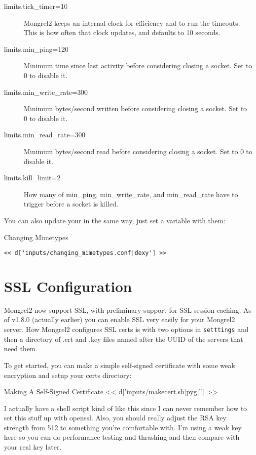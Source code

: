 \begin{description}
\item[limits.tick\_timer=10] Mongrel2 keeps an internal clock for efficiency and to run the
timeouts.  This is how often that clock updates, and defaults to 10 seconds.

\item[limits.min\_ping=120] Minimum time since last activity before considering closing a socket.  Set to 0 to disable it.
\item[limits.min\_write\_rate=300] Minimum bytes/second written before considering closing a socket. Set to 0 to disable it.
\item[limits.min\_read\_rate=300] Minimum bytes/second read before considering closing a socket. Set to 0 to disable it.
\item[limits.kill\_limit=2] How many of min\_ping, min\_write\_rate, and min\_read\_rate have to trigger before a socket is killed.
\end{description}


You can also update your  in the same way, just set a variable with them:

\begin{code}{Changing Mimetypes}
\begin{lstlisting}
<< d['inputs/changing_mimetypes.conf|dexy'] >>
\end{lstlisting}
\end{code}


\section{SSL Configuration}

Mongrel2 now support SSL, with preliminary support for SSL session caching.  As of 
v1.8.0 (actually earlier) you can enable SSL very easily for your Mongrel2 server.
How Mongrel2 configures SSL certs is with two options in \verb|setttings| and then
a directory of .crt and .key files named after the UUID of the servers that need them.

To get started, you can make a simple self-signed certificate with some weak encryption
and setup your certs directory:

\begin{code}{Making A Self-Signed Certificate}
<< d['inputs/makecert.sh|pyg|l'] >>
\end{code}

I actually have a shell script kind of like this since I can never remember how 
to set this stuff up with openssl.  Also, you should really adjust the RSA key
strength from 512 to something you're comfortable with.  I'm using a weak
key here so you can do performance testing and thrashing and then compare with
your real key later.

